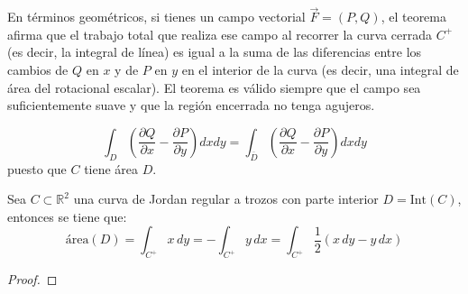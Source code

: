 En términos geométricos, si tienes un campo vectorial \(\vec{F} = (P, Q)\), el
teorema afirma que el trabajo total que realiza ese campo al recorrer la curva
cerrada \(C^+\) (es decir, la integral de línea) es igual a la suma de las
diferencias entre los cambios de \(Q\) en \(x\) y de \(P\) en \(y\) en el
interior de la curva (es decir, una integral de área del rotacional escalar).
El teorema es válido siempre que el campo sea suficientemente suave y que la
región encerrada no tenga agujeros.\\

\begin{observación}
$$\int_{D} \left(\frac{\partial Q}{\partial x} - \frac{\partial P}{\partial y}\right)dxdy = \int_{\overline{D}} \left(\frac{\partial Q}{\partial x} - \frac{\partial P}{\partial y}\right)dxdy$$
puesto que $C$ tiene área $D$.
\end{observación}

\begin{corolario}
    Sea \( C \subset \mathbb{R}^2 \) una curva de Jordan regular a trozos con parte interior \( D = \text{Int}(C) \), entonces se tiene que:
    \[
        \text{área}(D) = \int_{C^+} x\, dy = -\int_{C^+} y\, dx = \int_{C^+} \frac{1}{2} \left( x\, dy - y\, dx \right)
    \]
\end{corolario}

\begin{proof}

\end{proof}

